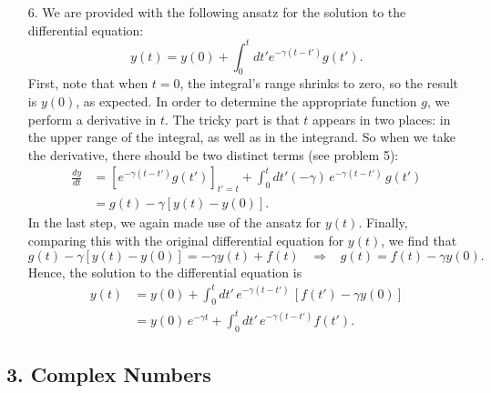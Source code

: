 \documentclass[10pt,a4paper]{article}
\begin{document}
\begin{enumerate}
\item[6.]
We are provided with the following ansatz for the solution to the
differential equation:
\begin{equation}
  y(t) = y(0) + \int_0^t dt' e^{-\gamma(t-t')} g(t').
\end{equation}
First, note that when $t = 0$, the integral's range shrinks to zero,
so the result is $y(0)$, as expected. In order to determine the
appropriate function $g$, we perform a derivative in $t$. The tricky
part is that $t$ appears in two places: in the upper range of the
integral, as well as in the integrand. So when we take the derivative,
there should be two distinct terms (see problem 5):
\begin{align}
  \frac{dy}{dt} &= \left[e^{-\gamma(t-t')} g(t')\right]_{t'=t} + \int_0^t dt'(-\gamma) \, e^{-\gamma(t-t')} \, g(t')\\
  &= g(t) - \gamma [y(t) - y(0)].
\end{align}
In the last step, we again made use of the ansatz for $y(t)$. Finally,
comparing this with the original differential equation for $y(t)$, we
find that
\begin{equation}
  g(t) - \gamma [y(t) - y(0)] = -\gamma y(t) + f(t) \;\;\; \Rightarrow \;\;\; g(t) = f(t) - \gamma y(0).
\end{equation}
Hence, the solution to the differential equation is
\begin{align}
  y(t) &= y(0) + \int_0^t dt' \, e^{-\gamma(t-t')} \,[f(t') - \gamma y(0)] \\
  &= y(0)\,e^{-\gamma t} + \int_0^t dt' \, e^{-\gamma(t-t')} f(t').
\end{align}
\end{enumerate}

\subsection*{3. Complex Numbers}
\end{document}
